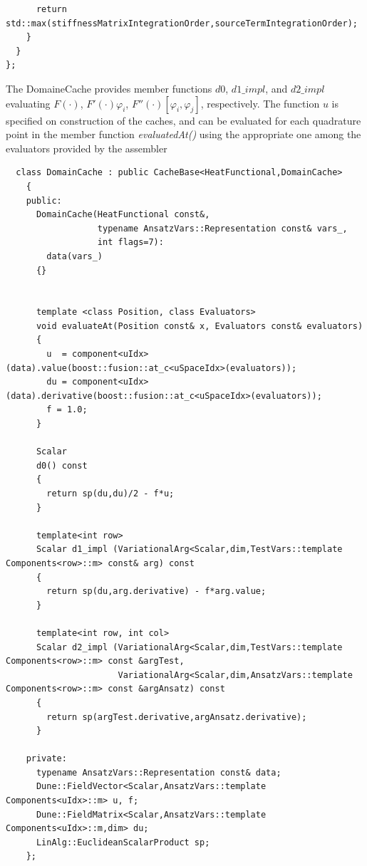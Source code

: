 \documentclass[11pt]{article}
\begin{document}
\begin{itemize}
\begin{lstlisting}
      return std::max(stiffnessMatrixIntegrationOrder,sourceTermIntegrationOrder);
    }
  }
};
\end{lstlisting}

The DomaineCache provides member functions $d0$, $d1\_impl$, and $d2\_impl$ evaluating  $F(\cdot )$, $F'(\cdot ) \varphi_i$,
$F''(\cdot ) [ \varphi_i,\varphi_j ]$, respectively.
The function $u$ is specified on construction of the caches, and can be evaluated for each quadrature point 
in the member function {\em evaluatedAt()} using the appropriate one among the evaluators provided by the assembler

\begin{lstlisting}
  class DomainCache : public CacheBase<HeatFunctional,DomainCache>
    {
    public:
      DomainCache(HeatFunctional const&,
                  typename AnsatzVars::Representation const& vars_,
                  int flags=7):
        data(vars_)
      {}
  
  
      template <class Position, class Evaluators>
      void evaluateAt(Position const& x, Evaluators const& evaluators)
      {
        u  = component<uIdx>(data).value(boost::fusion::at_c<uSpaceIdx>(evaluators));
        du = component<uIdx>(data).derivative(boost::fusion::at_c<uSpaceIdx>(evaluators));
        f = 1.0;
      }
  
      Scalar
      d0() const
      {
        return sp(du,du)/2 - f*u;
      }
  
      template<int row>
      Scalar d1_impl (VariationalArg<Scalar,dim,TestVars::template Components<row>::m> const& arg) const
      {
        return sp(du,arg.derivative) - f*arg.value;
      }
  
      template<int row, int col>
      Scalar d2_impl (VariationalArg<Scalar,dim,TestVars::template Components<row>::m> const &argTest,
                      VariationalArg<Scalar,dim,AnsatzVars::template Components<row>::m> const &argAnsatz) const
      {
        return sp(argTest.derivative,argAnsatz.derivative);
      }
  
    private:
      typename AnsatzVars::Representation const& data;
      Dune::FieldVector<Scalar,AnsatzVars::template Components<uIdx>::m> u, f;
      Dune::FieldMatrix<Scalar,AnsatzVars::template Components<uIdx>::m,dim> du;
      LinAlg::EuclideanScalarProduct sp;
    };
\end{lstlisting}



\end{itemize}
\end{document}
